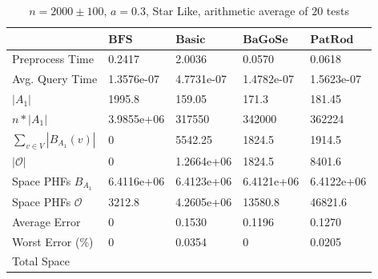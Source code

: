 \documentclass[shortabstract, lic, english]{iithesis}
\theoremstyle{definition} \newtheorem{definition}{Definition}[chapter]
\theoremstyle{remark} \newtheorem{remark}[definition]{Observation}
\theoremstyle{plain} \newtheorem{theorem}[definition]{Theorem}
\theoremstyle{plain} \newtheorem{lemma}[definition]{Lemma}
\theoremstyle{plain} \newtheorem{conjecture}[definition]{Conjecture}
\begin{document}
\begin{table}[H]
    \centering
    \begin{tabular}{ |p{3cm}||p{2cm}|p{2cm}|p{2cm}|p{2cm}|  } 
        \hline
        & $\mathbf{BFS}$ & $\mathbf{Basic}$ & $\mathbf{BaGoSe}$ & $\mathbf{PatRod}$ \\
        \hline
        \hline
        Preprocess Time                 & 0.2417     & 2.0036     & 0.0570      & 0.0618     \\
        \hline
        Avg. Query Time                 & 1.3576e-07 & 4.7731e-07 & 1.4782e-07  & 1.5623e-07 \\
        \hline
        $|A_1|$                         & 1995.8     & 159.05     & 171.3       & 181.45      \\
        \hline
        $n * |A_1|$                     & 3.9855e+06 & 317550     & 342000      & 362224     \\
        \hline
        $\sum_{v \in V} |B_{A_1}(v)| $  & 0          & 5542.25    & 1824.5      & 1914.5     \\
        \hline
        $|\mathcal{O}|$                 & 0          & 1.2664e+06 & 1824.5      & 8401.6     \\
        \hline
        Space PHFs $B_{A_1}$            & 6.4116e+06 & 6.4123e+06 & 6.4121e+06  & 6.4122e+06 \\
        \hline
        Space PHFs $\mathcal{O}$        & 3212.8     & 4.2605e+06 & 13580.8     & 46821.6     \\
        \hline
        Average Error                   & 0          & 0.1530     & 0.1196      & 0.1270     \\
        \hline
        Worst Error (\%)                & 0          & 0.0354     & 0           & 0.0205     \\
        \hline
        Total Space                     &            &            &             &            \\
        \hline

    \end{tabular}
    \caption{$n = 2000 \pm 100$, $a = 0.3$, Star Like, arithmetic average of $20$ tests}
\end{table}
\end{document}
